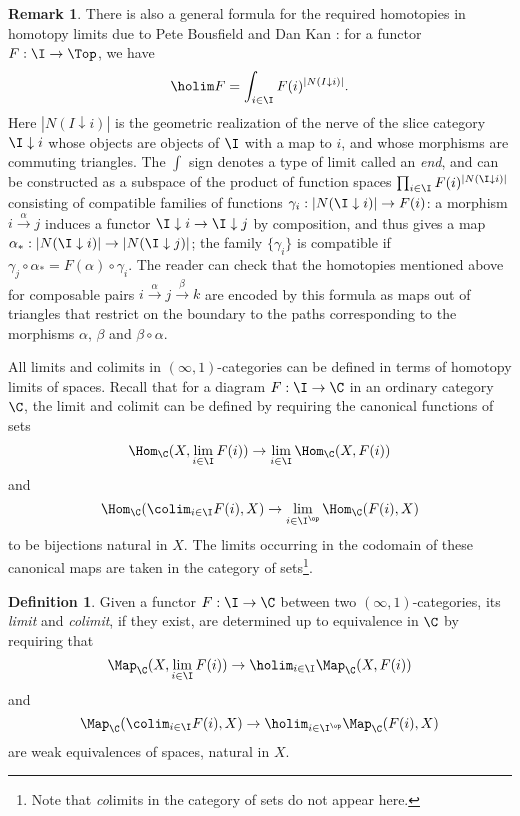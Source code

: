 \documentclass[12pt]{amsart}
\theoremstyle{definition} \newtheorem{definition}[theorem]{Definition}
\newtheorem{remark}[theorem]{Remark}
\numberwithin{equation}{section}
\newcommand{\oo}{\infty}
\newcommand{\io}{$(\oo,1)$}
\newcommand{\abs}[1]{\left|#1\right|}
\begin{document}
\begin{remark}
  There is also a general formula for the required homotopies in
  homotopy limits due to Pete Bousfield and Dan Kan
  \cite{BousfieldKan}: for a functor $F : \I \to \Top$, we have
  \[\holim F = \int_{i\in\I} F(i)^{\abs{N(I\downarrow i)}}.\] Here
  $\abs{N(I\downarrow i)}$ is the geometric realization of the nerve
  of the slice category $\I \downarrow i$ whose objects are objects of
  $\I$ with a map to $i$, and whose morphisms are commuting triangles.
  The $\int$ sign denotes a type of limit called an \emph{end}, and
  can be constructed as a subspace of the product of function spaces
  $\prod_{i \in \I} F(i)^{\abs{N(\I\downarrow i)}}$ consisting of
  compatible families of functions $\gamma_i :\abs{N(\I\downarrow i)}
  \to F(i)$: a morphism $i \xrightarrow{\alpha} j$ induces a functor
  $\I\downarrow i \to \I\downarrow j$ by composition, and thus gives a
  map $\alpha_* : \abs{N(\I\downarrow i)} \to \abs{N(\I\downarrow
    j)}$; the family $\{\gamma_i\}$ is compatible if $\gamma_j \circ
  \alpha_* = F(\alpha) \circ \gamma_i$. The reader can check that the
  homotopies mentioned above for composable pairs
  $i\xrightarrow{\alpha} j\xrightarrow{\beta} k$ are encoded by this
  formula as maps out of triangles that restrict on the boundary to
  the paths corresponding to the morphisms $\alpha$, $\beta$ and
  $\beta \circ \alpha$.
\end{remark}

All limits and colimits in \io-categories can be defined in terms of
homotopy limits of spaces. Recall that for a diagram $F : \I \to \C$
in an ordinary category $\C$, the limit and colimit can be defined by
requiring the canonical functions of sets
\[\Hom_\C(X,\lim_{i\in\I} F(i)) \to \lim_{i\in\I} \Hom_\C(X,F(i))\] and
\[\Hom_\C(\colim_{i\in\I} F(i),X) \to \lim_{i\in\I^{\op}}
  \Hom_\C(F(i),X)\]
to be bijections natural in $X$. The limits occurring in the codomain
of these canonical maps are taken in the category of
sets\footnote{Note that \emph{co}limits in the category of sets do not
  appear here.}.

\begin{definition}
  Given a functor $F : \I \to \C$ between two \io-categories, its
  \emph{limit} and \emph{colimit}, if they exist, are determined
  up to equivalence in $\C$ by requiring that
  \[\Map_\C(X,\lim_{i\in\I} F(i)) \to \holim_{i\in\I} \Map_\C(X,F(i))\] and
  \[\Map_\C(\colim_{i\in\I} F(i),X) \to \holim_{i\in\I^{\op}} \Map_\C(F(i),X)\]
  are weak equivalences of spaces, natural in $X$.
\end{definition}
\end{document}
